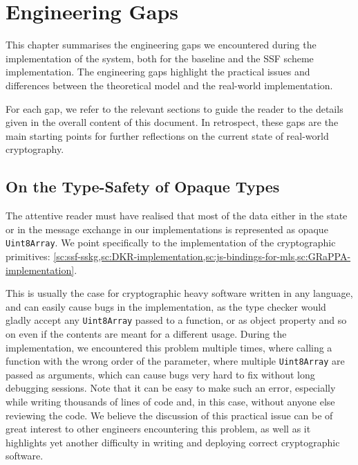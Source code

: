 \chapter{Engineering Gaps}\label{ch:gaps}

This chapter summarises the engineering gaps
we encountered during the implementation of the system,
both for the baseline and the SSF scheme implementation.
The engineering gaps highlight the practical issues
and differences between the theoretical model and 
the real-world implementation.

For each gap, we refer to the relevant sections to guide the reader
to the details given in the overall content of this document.
In retrospect, these gaps are the main starting
points for further reflections on the current
state of real-world cryptography.



\section{On the Type-Safety of Opaque Types}\label{sc:gap-type-safety-of-opaque-byte-arrays}
The attentive reader must have realised that most of the data either in the state
or in the message exchange in our implementations is represented as opaque \texttt{Uint8Array}.
We point specifically to the implementation of the cryptographic primitives:
\cref{sc:ssf-sskg,sc:DKR-implementation,sc:js-bindings-for-mls,sc:GRaPPA-implementation}.

This is usually the case for cryptographic heavy software written in any language, 
and can easily cause bugs in the implementation, as the type checker
would gladly accept any \texttt{Uint8Array} passed to a function, or as object 
property and so on even if the contents are meant for a different usage. 
During the implementation, we encountered this problem multiple times,
where calling a function with the wrong order of the parameter, where
multiple \texttt{Uint8Array} are passed as arguments, which can cause bugs
very hard to fix without long debugging sessions. Note that it can be
easy to make such an error, especially while writing thousands
of lines of code and, in this case, without anyone else reviewing the code.
We believe the discussion of this practical issue can be of great interest to other
engineers encountering this problem, as well as it highlights yet another
difficulty in writing and deploying correct cryptographic software.

